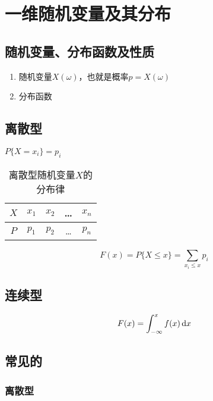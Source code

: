 \chapter{一维随机变量及其分布}

\section{随机变量、分布函数及性质}
\label{sec:随机变量_分布函数及性质}

\begin{enumerate}
    \item 随机变量$X(\omega)$，也就是概率$p = X(\omega)$
    \item 分布函数
\end{enumerate}

\section{离散型}
\label{sec:离散型}

$P\{X = x_i\} = p_i$

\begin{table}[htpb]
    \centering
    \caption{离散型随机变量$X$的分布律}
    \label{tab:离散型随机变量X的分布律}
    \begin{tabular}{|c|c|c|c|c|}
        \hline
        $X$ & $x_1$ & $x_2$ & \ldots & $x_n$ \\
        \hline
        $P$ & $p_1$ & $p_2$ & \ldots & $p_n$ \\
        \hline
    \end{tabular}
\end{table}

\[
    F(x) = P\{ X \leqslant x\} = \sum_{x_i \leqslant x} p_i
\]

\section{连续型}
\label{sec:连续型}

\[
    F(x) = \int_{-\infty}^x f(x) \dif x
\]

\section{常见的}
\label{sec:常见的}

\subsection{离散型}
\label{sub:离散型}

